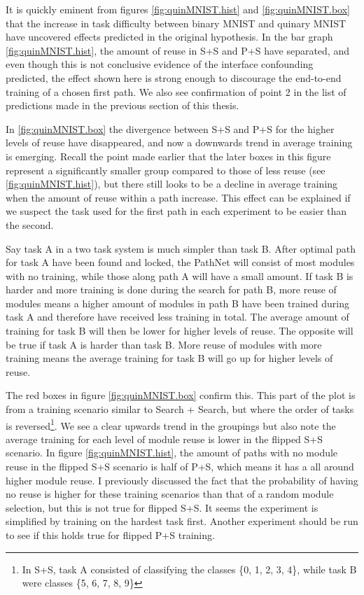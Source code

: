 It is quickly eminent from figures \ref{fig:quinMNIST.hist} and \ref{fig:quinMNIST.box} that the increase in task difficulty between binary MNIST and quinary MNIST have uncovered effects predicted in the original hypothesis. In the bar graph \ref{fig:quinMNIST.hist}, the amount of reuse in S+S and P+S have separated, and even though this is not conclusive evidence of the interface confounding predicted, the effect shown here is strong enough to discourage the end-to-end training of a chosen first path. We also see confirmation of point 2 in the list of predictions made in the previous section of this thesis. 

In \ref{fig:quinMNIST.box} the divergence between S+S and P+S for the higher levels of reuse have disappeared, and now a downwards trend in average training is emerging. Recall the point made earlier that the later boxes in this figure represent a significantly smaller group compared to those of less reuse (see \ref{fig:quinMNIST.hist}), but there still looks to be a decline in average training when the amount of reuse within a path increase. This effect can be explained if we suspect the task used for the first path in each experiment to be easier than the second. 

Say task A in a two task system is much simpler than task B. After optimal path for task A have been found and locked, the PathNet will consist of most modules with no training, while those along path A will have a small amount. If task B is harder and more training is done during the search for path B, more reuse of modules means a higher amount of modules in path B have been trained during task A and therefore have received less training in total. The average amount of training for task B will then be lower for higher levels of reuse. 
The opposite will be true if task A is harder than task B. More reuse of modules with more training means the average training for task B will go up for higher levels of reuse. 

The red boxes in figure \ref{fig:quinMNIST.box} confirm this. This part of the plot is from a training scenario similar to Search + Search, but where the order of tasks is reversed\footnote{In S+S, task A consisted of classifying the classes \{0, 1, 2, 3, 4\}, while task B were classes \{5, 6, 7, 8, 9\}}. We see a clear upwards trend in the groupings but also note the average training for each level of module reuse is lower in the flipped S+S scenario.
In figure \ref{fig:quinMNIST.hist}, the amount of paths with no module reuse in the flipped S+S scenario is half of P+S, which means it has a all around higher module reuse. I previously discussed the fact that the probability of having no reuse is higher for these training scenarios than that of a random module selection, but this is not true for flipped S+S. 
It seems the experiment is simplified by training on the hardest task first. Another experiment should be run to see if this holds true for flipped P+S training.

